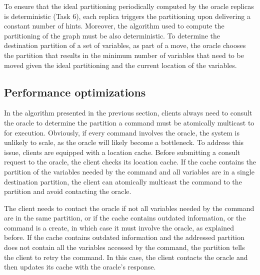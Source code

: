 To ensure that the ideal partitioning periodically computed by the oracle replicas is deterministic (Task 6), each replica triggers the partitioning upon delivering a constant number of hints.
Moreover, the algorithm used to compute the partitioning of the graph must be also deterministic.
To determine the destination partition of a set of variables, as part of a move, the oracle chooses the partition that results in the minimum number of variables that need to be moved given the ideal partitioning and the current location of the variables.

\subsection{Performance optimizations}
\label{sec:optm}

In the algorithm presented in the previous section, clients always need to consult the oracle to determine the partition a command must be atomically multicast to for execution.
Obviously, if every command involves the oracle, the system is unlikely to scale, as the oracle will likely become a bottleneck.
To address this issue, clients are equipped with a location cache.
Before submitting a consult request to the oracle, the client checks its location cache.
If the cache contains the partition of the variables needed by the command and all variables are in a single destination partition, the client can atomically multicast the command to the partition and avoid contacting the oracle. 

The client needs to contact the oracle if not all variables needed by the command are in the same partition, or if the cache contains outdated information, or the command is a create, in which case it must involve the oracle, as explained before.
If the cache contains outdated information and the addressed partition does not contain all the variables accessed by the command, the partition tells the client to retry the command.
In this case, the client contacts the oracle and then updates its cache with the oracle's response.






